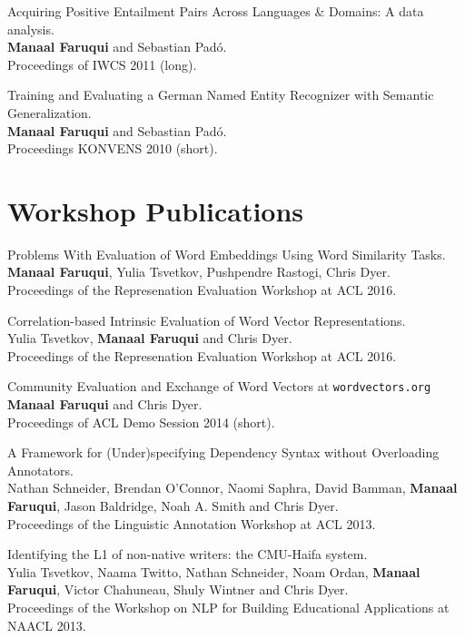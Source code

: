 \documentclass[margin,line]{res}
\begin{document}
\begin{resume}
Acquiring Positive Entailment Pairs Across Languages \& Domains: A data analysis.\\
\textbf{Manaal Faruqui} and Sebastian Pad\'{o}.\\
Proceedings of IWCS 2011 (long).

Training and Evaluating a German Named Entity Recognizer with Semantic Generalization.\\
\textbf{Manaal Faruqui} and Sebastian Pad\'{o}.\\
Proceedings KONVENS 2010 (short).

\section{\sc Workshop Publications}

Problems With Evaluation of Word Embeddings Using Word Similarity Tasks.\\
\textbf{Manaal Faruqui}, Yulia Tsvetkov, Pushpendre Rastogi, Chris Dyer.\\
Proceedings of the Represenation Evaluation Workshop at ACL 2016.

Correlation-based Intrinsic Evaluation of Word Vector Representations.\\
Yulia Tsvetkov, \textbf{Manaal Faruqui} and Chris Dyer.\\
Proceedings of the Represenation Evaluation Workshop at ACL 2016.

\pagebreak

Community Evaluation and Exchange of Word Vectors at \texttt{wordvectors.org}\\
\textbf{Manaal Faruqui} and Chris Dyer.\\
Proceedings of ACL Demo Session 2014 (short).

A Framework for (Under)specifying Dependency Syntax without Overloading Annotators.\\
Nathan Schneider, Brendan O'Connor, Naomi Saphra, David Bamman, \textbf{Manaal Faruqui}, Jason Baldridge, Noah A. Smith and Chris Dyer.\\
Proceedings of the Linguistic Annotation Workshop at ACL 2013.

Identifying the L1 of non-native writers: the CMU-Haifa system.\\
Yulia Tsvetkov, Naama Twitto, Nathan Schneider, Noam Ordan, \textbf{Manaal Faruqui}, Victor Chahuneau, Shuly Wintner and Chris Dyer.\\
Proceedings of the Workshop on NLP for Building Educational Applications at NAACL 2013.


\end{resume}
\end{document}
